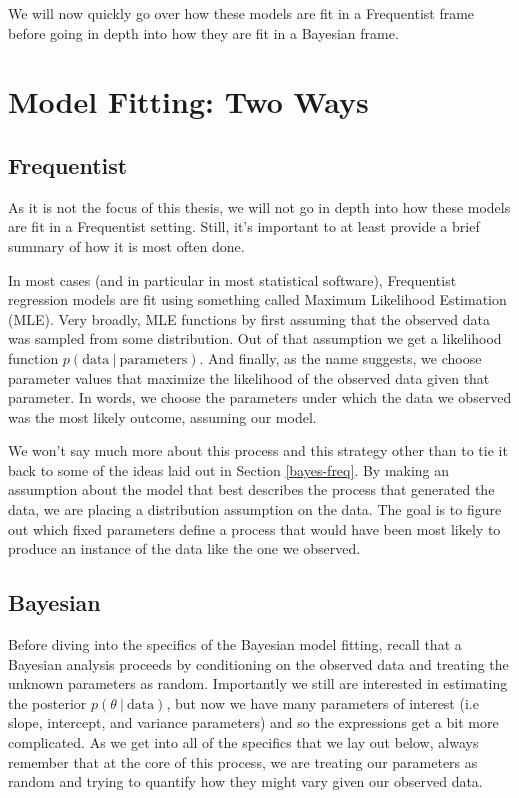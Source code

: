 \documentclass[12pt,twoside]{reedthesis}
\begin{document}
We will now quickly go over how these models are fit in a Frequentist frame before going in depth into how they are fit in a Bayesian frame.

\hypertarget{twofits}{%
\section{Model Fitting: Two Ways}\label{twofits}}

\hypertarget{frequentist}{%
\subsection{Frequentist}\label{frequentist}}

As it is not the focus of this thesis, we will not go in depth into how these models are fit in a Frequentist setting. Still, it's important to at least provide a brief summary of how it is most often done.

In most cases (and in particular in most statistical software), Frequentist regression models are fit using something called Maximum Likelihood Estimation (MLE). Very broadly, MLE functions by first assuming that the observed data was sampled from some distribution. Out of that assumption we get a likelihood function \(p(\text{data} \ | \ \text{parameters})\). And finally, as the name suggests, we choose parameter values that maximize the likelihood of the observed data given that parameter. In words, we choose the parameters under which the data we observed was the most likely outcome, assuming our model.

We won't say much more about this process and this strategy other than to tie it back to some of the ideas laid out in Section \ref{bayes-freq}. By making an assumption about the model that best describes the process that generated the data, we are placing a distribution assumption on the data. The goal is to figure out which fixed parameters define a process that would have been most likely to produce an instance of the data like the one we observed.

\hypertarget{bayesian}{%
\subsection{Bayesian}\label{bayesian}}

Before diving into the specifics of the Bayesian model fitting, recall that a Bayesian analysis proceeds by conditioning on the observed data and treating the unknown parameters as random. Importantly we still are interested in estimating the posterior \(p(\theta \ | \ \text{data})\), but now we have many parameters of interest (i.e slope, intercept, and variance parameters) and so the expressions get a bit more complicated. As we get into all of the specifics that we lay out below, always remember that at the core of this process, we are treating our parameters as random and trying to quantify how they might vary given our observed data.
\end{document}
